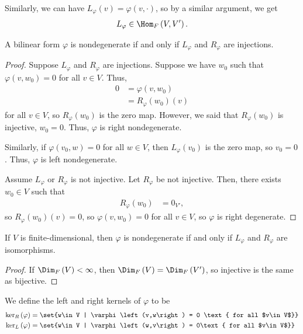\documentclass[10pt]{mypackage}
\begin{document}
  Similarly, we can have $L_{\varphi}\left(v\right) = \varphi\left(v,\cdot\right)$, so by a similar argument, we get
  \begin{align*}
    L_{\varphi}\in \Hom_{F}\left(V,V'\right).
  \end{align*}
  \begin{lemma}
    A bilinear form $\varphi$ is nondegenerate if and only if $L_{\varphi}$ and $R_{\varphi}$ are injections.
  \end{lemma}
  \begin{proof}
    Suppose $L_{\varphi}$ and $R_{\varphi}$ are injections. Suppose we have $w_0$ such that $\varphi\left(v,w_0\right) = 0$ for all $v\in V$. Thus,
    \begin{align*}
      0 &= \varphi\left(v,w_0\right)\\
        &= R_{\varphi}\left(w_0\right)\left(v\right)
    \end{align*}
    for all $v\in V$, so $R_{\varphi}\left(w_0\right)$ is the zero map. However, we said that $R_{\varphi}\left(w_0\right)$ is injective, $w_0 = 0$. Thus, $\varphi$ is right nondegenerate.\newline

    Similarly, if $\varphi\left(v_0,w\right) = 0$ for all $w\in V$, then $L_{\varphi}\left(v_0\right)$ is the zero map, so $v_0 = 0$. Thus, $\varphi$ is left nondegenerate.\newline

    Assume $L_{\varphi}$ or $R_{\varphi}$ is not injective. Let $R_{\varphi}$ be not injective. Then, there exists $w_0\in V$ such that
    \begin{align*}
      R_{\varphi}\left(w_0\right) &= 0_{V'},
    \end{align*}
    so $R_{\varphi}\left(w_0\right)\left(v\right) = 0$, so $\varphi\left(v,w_0\right) = 0$ for all $v\in V$, so $\varphi$ is right degenerate.
  \end{proof}
  \begin{corollary}
    If $V$ is finite-dimensional, then $\varphi$ is nondegenerate if and only if $L_{\varphi}$ and $R_{\varphi}$ are isomorphisms.
  \end{corollary}
  \begin{proof}
    If $\Dim_{F}\left(V\right) < \infty$, then $\Dim_{F}\left(V\right) = \Dim_{F}\left(V'\right)$, so injective is the same as bijective.
  \end{proof}
  \begin{definition}
    We define the left and right kernels of $\varphi$ to be
    \begin{align*}
      \ker_{R}\left(\varphi\right) &= \set{w\in V | \varphi\left(v,w\right) = 0 \text{ for all $v\in V$}}\\
      \ker_{L}\left(\varphi\right) &= \set{w\in V | \varphi\left(w,v\right) = 0\text{ for all $v\in V$}}
    \end{align*}
  \end{definition}
\end{document}
